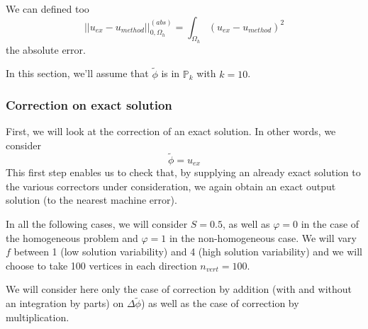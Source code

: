 We can defined too
\begin{equation*}
	||u_{ex}-u_{method}||_{0,\Omega_h}^{(abs)}=\int_{\Omega_h} (u_{ex}-u_{method})^2
\end{equation*}
the absolute error.

In this section, we'll assume that $\tilde{\phi}$ is in $\mathbb{P}_k$ with $k=10$.

\subsubsection{Correction on exact solution} \label{Corr.results.ana}

First, we will look at the correction of an exact solution. In other words, we consider
\begin{equation*}
	\tilde{\phi}=u_{ex}
\end{equation*}
This first step enables us to check that, by supplying an already exact solution to the various correctors under consideration, we again obtain an exact output solution (to the nearest machine error).

In all the following cases, we will consider $S=0.5$, as well as $\varphi=0$ in the case of the homogeneous problem and $\varphi=1$ in the non-homogeneous case. We will vary $f$ between 1 (low solution variability) and 4 (high solution variability) and we will choose to take 100 vertices in each direction $n_{vert}=100$.

\begin{Rem}
	We will consider here only the case of correction by addition (with and without an integration by parts) on $\Delta\tilde{\phi}$) as well as the case of correction by multiplication.
\end{Rem}

